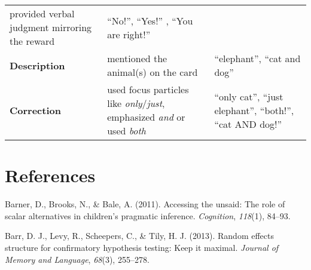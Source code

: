 \documentclass[
  english,
  ,man,floatsintext]{apa6}
\begin{document}
\begin{longtable}[]{@{}lll@{}}
\begin{minipage}[t]{0.46\columnwidth}
provided verbal judgment mirroring the reward\strut
\end{minipage} & \begin{minipage}[t]{0.31\columnwidth}\raggedright
\enquote{No!}, \enquote{Yes!} , \enquote{You are right!}\strut
\end{minipage}\tabularnewline
\begin{minipage}[t]{0.14\columnwidth}\raggedright
\textbf{Description}\strut
\end{minipage} & \begin{minipage}[t]{0.46\columnwidth}\raggedright
mentioned the animal(s) on the card\strut
\end{minipage} & \begin{minipage}[t]{0.31\columnwidth}\raggedright
\enquote{elephant}, \enquote{cat and dog}\strut
\end{minipage}\tabularnewline
\begin{minipage}[t]{0.14\columnwidth}\raggedright
\textbf{Correction}\strut
\end{minipage} & \begin{minipage}[t]{0.46\columnwidth}\raggedright
used focus particles like \emph{only}/\emph{just}, emphasized \emph{and} or used \emph{both}\strut
\end{minipage} & \begin{minipage}[t]{0.31\columnwidth}\raggedright
\enquote{only cat}, \enquote{just elephant}, \enquote{both!}, \enquote{cat AND dog!}\strut
\end{minipage}\tabularnewline
\bottomrule
\end{longtable}

\hypertarget{references}{%
\section{References}\label{references}}

\setlength{\parindent}{-0.5in}
\setlength{\leftskip}{0.5in}

\hypertarget{refs}{}
\leavevmode\hypertarget{ref-barner2011accessing}{}%
Barner, D., Brooks, N., \& Bale, A. (2011). Accessing the unsaid: The role of scalar alternatives in children's pragmatic inference. \emph{Cognition}, \emph{118}(1), 84--93.

\leavevmode\hypertarget{ref-barr2013random}{}%
Barr, D. J., Levy, R., Scheepers, C., \& Tily, H. J. (2013). Random effects structure for confirmatory hypothesis testing: Keep it maximal. \emph{Journal of Memory and Language}, \emph{68}(3), 255--278.
\end{document}
